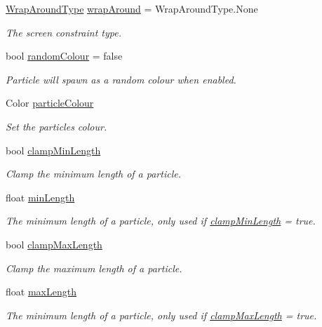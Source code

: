\begin{DoxyCompactItemize}
\hyperlink{namespace_p_e2_d_a510b407ed8d0de3476df258ab95e1e50}{Wrap\+Around\+Type} \hyperlink{class_p_e2_d_1_1_custom_particle_emitter_a894bcd6445f3443f1261ae98b50d097d}{wrap\+Around} = Wrap\+Around\+Type.\+None
\begin{DoxyCompactList}\small\item\em The screen constraint type. \end{DoxyCompactList}\item 
bool \hyperlink{class_p_e2_d_1_1_custom_particle_emitter_a2434866e0ea2e419987a2321f2455b3c}{random\+Colour} = false
\begin{DoxyCompactList}\small\item\em Particle will spawn as a random colour when enabled. \end{DoxyCompactList}\item 
Color \hyperlink{class_p_e2_d_1_1_custom_particle_emitter_a1ceaf22fc2d96bb356dfc6c86b6d2d66}{particle\+Colour}
\begin{DoxyCompactList}\small\item\em Set the particles colour. \end{DoxyCompactList}\item 
bool \hyperlink{class_p_e2_d_1_1_custom_particle_emitter_ab860a5e7888aa0c849a9815e3934bc7f}{clamp\+Min\+Length}
\begin{DoxyCompactList}\small\item\em Clamp the minimum length of a particle. \end{DoxyCompactList}\item 
float \hyperlink{class_p_e2_d_1_1_custom_particle_emitter_aaea8df4050265a7c0e07a35b9c9fde0e}{min\+Length}
\begin{DoxyCompactList}\small\item\em The minimum length of a particle, only used if \hyperlink{class_p_e2_d_1_1_custom_particle_emitter_ab860a5e7888aa0c849a9815e3934bc7f}{clamp\+Min\+Length} = true. \end{DoxyCompactList}\item 
bool \hyperlink{class_p_e2_d_1_1_custom_particle_emitter_a68678a550300ff27596c7d667df2d4f2}{clamp\+Max\+Length}
\begin{DoxyCompactList}\small\item\em Clamp the maximum length of a particle. \end{DoxyCompactList}\item 
float \hyperlink{class_p_e2_d_1_1_custom_particle_emitter_a88aef32381d4e9931fe75769bde81beb}{max\+Length}
\begin{DoxyCompactList}\small\item\em The minimum length of a particle, only used if \hyperlink{class_p_e2_d_1_1_custom_particle_emitter_a68678a550300ff27596c7d667df2d4f2}{clamp\+Max\+Length} = true. \end{DoxyCompactList}\item 

\end{DoxyCompactItemize}
